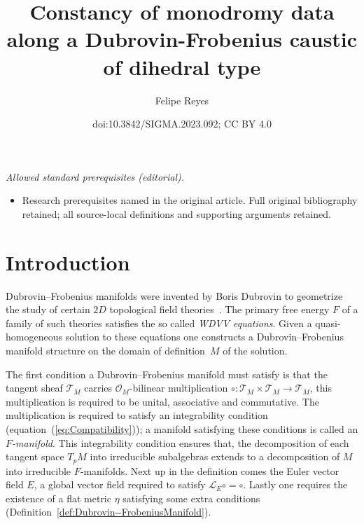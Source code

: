 \documentclass[10pt,a4paper]{amsart}
\title{Constancy of monodromy data along a Dubrovin-Frobenius caustic of dihedral type}
\author{Felipe Reyes}
\date{doi:10.3842/SIGMA.2023.092; CC BY 4.0}
\numberwithin{equation}{section}
\begin{document}
\maketitle
\noindent\textit{Allowed standard prerequisites (editorial).}\begin{itemize}
\item Research prerequisites named in the original article. Full original bibliography retained; all source-local definitions and supporting arguments retained.
\end{itemize}\medskip
\section{Introduction}
Dubrovin--Frobenius manifolds were invented by Boris Dubrovin to geometrize the study of certain $2D$ topological field theories~\cite{Dubrovin:1994hc,Dubrovin:1998fe}. The primary free energy $F$ of a family of such theories satisfies the so called {\it WDVV equations}. Given a quasi-homogeneous solution to these equations one constructs a Dubrovin--Frobenius manifold structure on the domain of definition~$M$ of the solution.

The first condition a Dubrovin--Frobenius manifold must satisfy is that the tangent sheaf $\mathcal{T}_{M}$ carries $\mathcal{O}_{M}$-bilinear multiplication $\circ\colon\mathcal{T}_{M}\times\mathcal{T}_{M}\rightarrow\mathcal{T}_{M}$, this multiplication is required to be unital, associative and commutative. The multiplication is required to satisfy an integrability condition (equation~(\ref{eq:Compatibility})); a manifold satisfying these conditions is called an \emph{$F$-manifold}. This integrability condition ensures that, the decomposition of each tangent space $T_{p}M$ into irreducible subalgebras extends to a decomposition of $M$ into irreducible $F$-manifolds. Next up in the definition comes the Euler vector field $E$, a global vector field required to satisfy $\mathcal{L}_{E}\circ=\circ$. Lastly one requires the existence of a flat metric $\eta$ satisfying some extra conditions (Definition~\ref{def:Dubrovin--FrobeniusManifold}).
\end{document}
